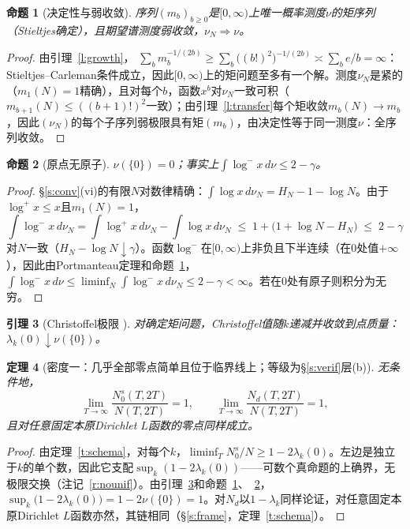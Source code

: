 \documentclass[11pt]{article}
\numberwithin{equation}{section}
\newtheorem{theorem}{定理}[section]
\newtheorem{lemma}[theorem]{引理}
\newtheorem{proposition}[theorem]{命题}
\theoremstyle{definition}
\theoremstyle{remark}
\begin{document}
\begin{proposition}[决定性与弱收敛]\label{p:det}
序列$(m_b)_{b\ge0}$是$[0,\infty)$上唯一概率测度$\nu$的矩序列（Stieltjes确定），且期望谱测度弱收敛，$\nu_N\Rightarrow\nu$。
\end{proposition}

\begin{proof}
由引理~\ref{l:growth}，
$\sum_b m_b^{-1/(2b)}\ge\sum_b\bigl((b!)^2\bigr)^{-1/(2b)}
\asymp\sum_b e/b=\infty$：Stieltjes--Carleman条件成立，因此$[0,\infty)$上的矩问题至多有一个解。测度$\nu_N$是紧的（$m_1(N)=1$精确），且对每个$b$，函数$x^b$对$\nu_N$一致可积（$m_{b+1}(N)\le((b{+}1)!)^2$一致）；由引理~\ref{l:transfer}每个矩收敛$m_b(N)\to m_b$，因此$(\nu_N)$的每个子序列弱极限具有矩$(m_b)$，由决定性等于同一测度$\nu$：全序列收敛。
\end{proof}

\begin{proposition}[原点无原子]\label{p:noatom}
$\nu(\{0\})=0$；事实上$\int\log^{-}x\,d\nu\le2-\gamma$。
\end{proposition}

\begin{proof}
\S\ref{s:conv}(vi)的有限$N$对数律精确：$\int\log x\,d\nu_N=H_N-1-\log N$。由于$\log^{+}x\le x$且$m_1(N)=1$，
\[
\int\log^{-}x\,d\nu_N
=\int\log^{+}x\,d\nu_N-\int\log x\,d\nu_N
\;\le\;1+\bigl(1+\log N-H_N\bigr)\;\le\;2-\gamma
\]
对$N$一致（$H_N-\log N\downarrow\gamma$）。函数$\log^{-}$在$[0,\infty)$上非负且下半连续（在$0$处值$+\infty$），因此由Portmanteau定理和命题~\ref{p:det}，
$\int\log^{-}x\,d\nu\le\liminf_N\int\log^{-}x\,d\nu_N
\le2-\gamma<\infty$。若在$0$处有原子则积分为无穷。
\end{proof}

\begin{lemma}[Christoffel极限 \cite{Akh,Sim98}]\label{l:chr}
对确定矩问题，Christoffel值随$k$递减并收敛到点质量：
$\lambda_k(0)\downarrow\nu(\{0\})$。
\end{lemma}

\begin{theorem}[密度一：几乎全部零点简单且位于临界线上；等级为\S\ref{s:verif}层(b)]\label{t:dens1}
无条件地，
\[
\lim_{T\to\infty}\frac{N_0^{s}(T,2T)}{N(T,2T)}=1,
\qquad
\lim_{T\to\infty}\frac{N_d(T,2T)}{N(T,2T)}=1,
\]
且对任意固定本原Dirichlet $L$函数的零点同样成立。
\end{theorem}

\begin{proof}
由定理~\ref{t:schema}，对每个$k$，$\liminf_T N_0^{s}/N\ge1-2\lambda_k(0)$。左边是独立于$k$的单个数，因此它支配$\sup_k(1-2\lambda_k(0))$——可数个真命题的上确界，无极限交换（注记~\ref{r:nounif}）。由引理~\ref{l:chr}和命题~\ref{p:det}、~\ref{p:noatom}，$\sup_k\bigl(1-2\lambda_k(0)\bigr)=1-2\nu(\{0\})=1$。对$N_d$以$1-\lambda_k$同样论证，对任意固定本原Dirichlet $L$函数亦然，其链相同（\S\ref{s:frame}，定理~\ref{t:schema}）。
\end{proof}
\end{document}
